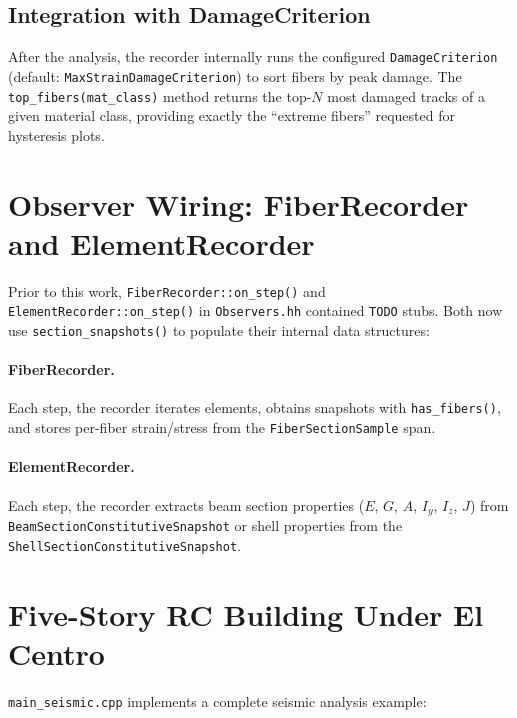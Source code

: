 \subsection{Integration with DamageCriterion}

After the analysis, the recorder internally runs the configured
\texttt{DamageCriterion} (default: \texttt{MaxStrainDamageCriterion})
to sort fibers by peak damage.  The \texttt{top\_fibers(mat\_class)}
method returns the top-$N$ most damaged tracks of a given material
class, providing exactly the ``extreme fibers'' requested for
hysteresis plots.


\section{Observer Wiring: FiberRecorder and ElementRecorder}
\label{sec:seismic-observer-wiring}

Prior to this work, \texttt{FiberRecorder::on\_step()} and
\texttt{ElementRecorder::on\_step()} in \texttt{Observers.hh}
contained \texttt{TODO} stubs.  Both now use
\texttt{section\_snapshots()} to populate their internal
data structures:

\paragraph{FiberRecorder.}
Each step, the recorder iterates elements, obtains snapshots with
\texttt{has\_fibers()}, and stores per-fiber strain/stress from
the \texttt{FiberSectionSample} span.

\paragraph{ElementRecorder.}
Each step, the recorder extracts beam section properties
($E$, $G$, $A$, $I_y$, $I_z$, $J$) from
\texttt{BeamSectionConstitutiveSnapshot} or shell properties
from the \texttt{ShellSectionConstitutiveSnapshot}.


\section{Five-Story RC Building Under El Centro}
\label{sec:seismic-building-example}

\texttt{main\_seismic.cpp} implements a complete seismic analysis
example:

